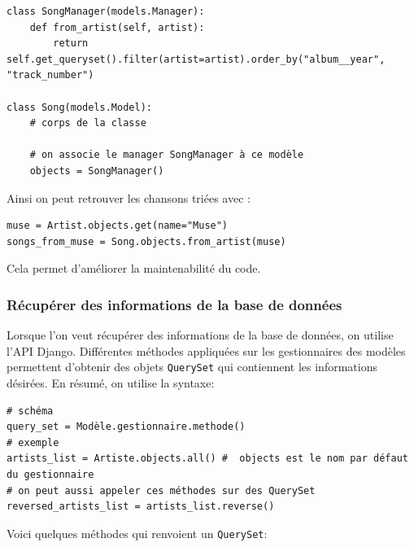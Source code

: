 \documentclass[a4paper, 10pt]{article}
\begin{document}
\begin{verbatim}
class SongManager(models.Manager):
    def from_artist(self, artist):
        return self.get_queryset().filter(artist=artist).order_by("album__year", "track_number")

class Song(models.Model):
    # corps de la classe
    
    # on associe le manager SongManager à ce modèle
    objects = SongManager()
\end{verbatim}

Ainsi on peut retrouver les chansons triées avec :

\begin{verbatim}
muse = Artist.objects.get(name="Muse")
songs_from_muse = Song.objects.from_artist(muse)
\end{verbatim}

Cela permet d'améliorer la maintenabilité du code.


\subsubsection{Récupérer des informations de la base de données}
Lorsque  l'on veut récupérer des informations de la base de données, on utilise l'API Django. Différentes méthodes appliquées sur les gestionnaires des modèles permettent d'obtenir des objets \texttt{QuerySet} qui contiennent les informations désirées. En résumé, on utilise la syntaxe:
\begin{verbatim}
# schéma
query_set = Modèle.gestionnaire.methode()
# exemple
artists_list = Artiste.objects.all() #  objects est le nom par défaut du gestionnaire
# on peut aussi appeler ces méthodes sur des QuerySet
reversed_artists_list = artists_list.reverse()
\end{verbatim}

Voici quelques méthodes qui renvoient un \texttt{QuerySet}:
\end{document}
